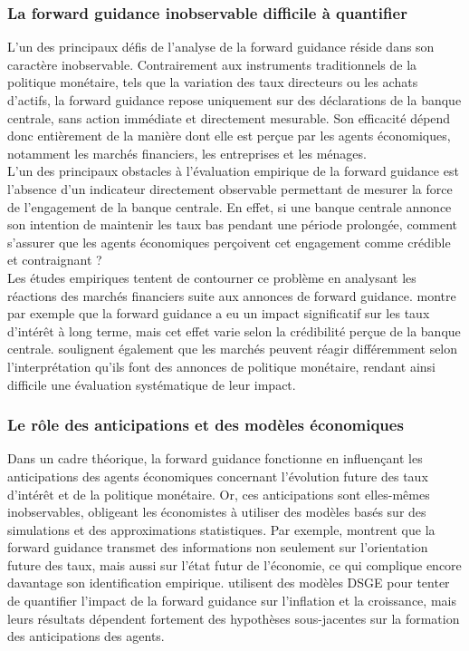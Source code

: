 \subsubsection{La forward guidance inobservable difficile à quantifier}

L’un des principaux défis de l’analyse de la forward guidance réside dans son caractère inobservable. Contrairement aux instruments traditionnels de la politique monétaire, tels que la variation des taux directeurs ou les achats d’actifs, la forward guidance repose uniquement sur des déclarations de la banque centrale, sans action immédiate et directement mesurable. Son efficacité dépend donc entièrement de la manière dont elle est perçue par les agents économiques, notamment les marchés financiers, les entreprises et les ménages.\\

L’un des principaux obstacles à l’évaluation empirique de la forward guidance est l’absence d’un indicateur directement observable permettant de mesurer la force de l’engagement de la banque centrale. En effet, si une banque centrale annonce son intention de maintenir les taux bas pendant une période prolongée, comment s’assurer que les agents économiques perçoivent cet engagement comme crédible et contraignant ?\\

Les études empiriques tentent de contourner ce problème en analysant les réactions des marchés financiers suite aux annonces de forward guidance. \citep{swanson2021} montre par exemple que la forward guidance a eu un impact significatif sur les taux d’intérêt à long terme, mais cet effet varie selon la crédibilité perçue de la banque centrale. \citep{campbell2012} soulignent également que les marchés peuvent réagir différemment selon l’interprétation qu’ils font des annonces de politique monétaire, rendant ainsi difficile une évaluation systématique de leur impact.

\subsubsection{Le rôle des anticipations et des modèles économiques}

Dans un cadre théorique, la forward guidance fonctionne en influençant les anticipations des agents économiques concernant l’évolution future des taux d’intérêt et de la politique monétaire. Or, ces anticipations sont elles-mêmes inobservables, obligeant les économistes à utiliser des modèles basés sur des simulations et des approximations statistiques. Par exemple, \citep{nakamura2018} montrent que la forward guidance transmet des informations non seulement sur l’orientation future des taux, mais aussi sur l’état futur de l’économie, ce qui complique encore davantage son identification empirique. \citep{delnegro2015} utilisent des modèles DSGE pour tenter de quantifier l’impact de la forward guidance sur l’inflation et la croissance, mais leurs résultats dépendent fortement des hypothèses sous-jacentes sur la formation des anticipations des agents.


